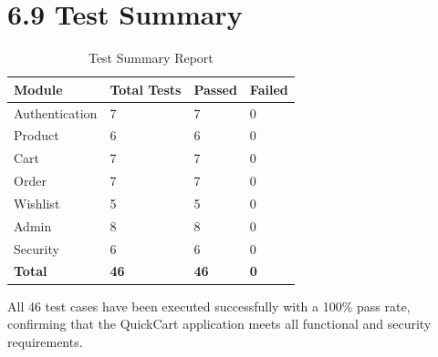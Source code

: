 \documentclass[12pt,a4paper]{report}
\begin{document}
\section*{6.9 Test Summary}

\begin{table}[H]
\centering
\begin{tabular}{|p{4cm}|p{3cm}|p{3cm}|p{3cm}|}
\hline
\textbf{Module} & \textbf{Total Tests} & \textbf{Passed} & \textbf{Failed} \\
\hline
Authentication & 7 & 7 & 0 \\
\hline
Product & 6 & 6 & 0 \\
\hline
Cart & 7 & 7 & 0 \\
\hline
Order & 7 & 7 & 0 \\
\hline
Wishlist & 5 & 5 & 0 \\
\hline
Admin & 8 & 8 & 0 \\
\hline
Security & 6 & 6 & 0 \\
\hline
\textbf{Total} & \textbf{46} & \textbf{46} & \textbf{0} \\
\hline
\end{tabular}
\caption{Test Summary Report}
\end{table}

All 46 test cases have been executed successfully with a 100\% pass rate, confirming that the QuickCart application meets all functional and security requirements.
\end{document}
